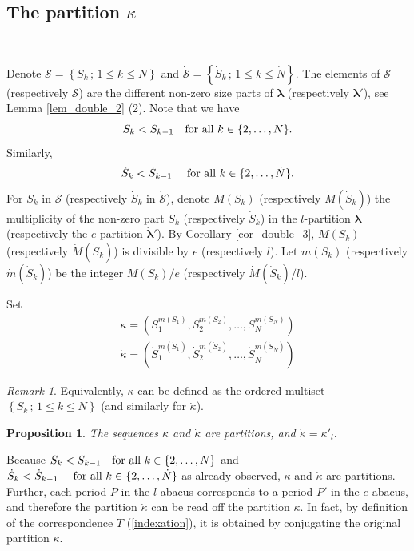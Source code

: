 \documentclass[twoside,12pt]{amsart}
\theoremstyle{plain}
\newcommand{\sS}{\mathscr{S}}
\newcommand{\la}{\lambda}
\newcommand{\ka}{\kappa}
\newcommand{\bla}{\boldsymbol{\la}}
\newcommand{\dS}{\dot{S}}
\newcommand{\dN}{\dot{N}}
\newcommand{\dM}{\dot{M}}
\newcommand{\dm}{\dot{m}}
\newcommand{\dka}{\dot{\ka}}
\newcommand{\dsS}{\dot{\sS}}
\newcommand{\dbla}{\dot{\bla}}
\newtheorem{prop}[num]{Proposition}
\theoremstyle{remark}
\newtheorem{rem}[num]{Remark}
\begin{document}
\subsection{The partition $\ka$}\

Denote $\sS = \left\{ S_k \, ; \, 1\leq k \leq N \right\}$
and $\dsS = \left\{  \dS_k \, ; \, 1\leq k \leq \dN \right\}$.
The elements of $\sS$ (respectively $\dsS$) are the different
non-zero size parts of $\bla$ (respectively $\dbla'$), see Lemma \ref{lem_double_2} (2).
Note that we have $$S_k < S_{k-1} \text{\quad for all } k\in\{ 2,\dots,N \}.$$
Similarly, $$\dS_k < \dS_{k-1} \text{ \quad for all } k\in\{ 2,\dots,\dN \}.$$
For $S_k$ in $\sS$ (respectively $\dS_k$ in $\dsS$),
denote $M(S_k)$ (respectively $\dM(\dS_k)$)
the multiplicity of the non-zero part $S_k$ (respectively $\dS_k$)
in the $l$-partition $\bla$
(respectively the $e$-partition $\dbla'$).
By Corollary \ref{cor_double_3}, $M(S_k)$ (respectively $\dM(\dS_k)$)
is divisible by $e$ (respectively $l$).
Let $m(S_k)$ (respectively $\dm(\dS_k)$) be the integer $M(S_k)/e$
(respectively $\dM(\dS_k)/l$).

Set 
\begin{equation}\label{kappa}
\begin{array}{l}
\ka = (S_1^{m(S_1)},S_2^{m(S_2)}, \dots, S_{N}^{m(S_{N})}) \\
\dka = (\dS_1^{\dm(\dS_1)},\dS_2^{\dm(\dS_2)},\dots, \dS_{\dN}^{\dm(\dS_{\dN})})
\end{array}
\end{equation}

\begin{rem}\label{rem_kappa_1}
Equivalently, 
$\ka$ can be defined as 
the ordered multiset $\left\{ S_k \, ; \, 1\leq k \leq N \right\}$
(and similarly for $\dka$).
\end{rem}


\begin{prop}\label{prop_kappa_1}
The sequences $\ka$ and $\dka$ are partitions, and $\dka = \ka'_l$.
\end{prop}

\proof
Because $S_k < S_{k-1} \text{\quad for all } k\in\{ 2,\dots,N \}$ and
$\dS_k < \dS_{k-1} \text{ \quad for all } k\in\{ 2,\dots,\dN \}$ as already observed,
$\ka$ and $\dka$ are partitions.
Further, each period $P$ in the $l$-abacus corresponds to a period $P'$ in the $e$-abacus,
and therefore the partition $\dka$ can be read off the partition $\ka$.
In fact, by definition of the correspondence $T$ (\ref{indexation}),
it is obtained by conjugating the original partition $\ka$.
\endproof
\end{document}
